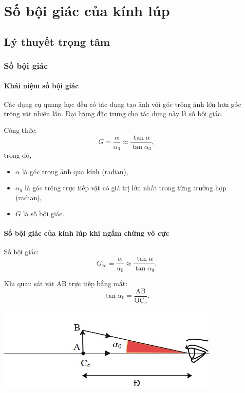 
\chapter{Số bội giác của kính lúp}

\section{Lý thuyết trọng tâm}

\subsection{Số bội giác}
\subsubsection{Khái niệm số bội giác}
Các dụng cụ quang học đều có tác dụng tạo ảnh với góc trông ảnh lớn hơn góc trông vật nhiều lần. Đại lượng đặc trưng cho tác dụng này là số bội giác.

Công thức:
\begin{equation}
G=\dfrac{\alpha}{\alpha_0}\approx \dfrac{\tan \alpha}{\tan \alpha_0},
\end{equation}
trong đó,
\begin{itemize}
	\item $\alpha$ là góc trong ảnh qua kính (radian),
	\item $\alpha_0$ là góc trông trực tiếp vật có giá trị lớn nhất trong từng trường hợp (radian),
	\item $G$ là số bội giác. 
	
\end{itemize}

\subsubsection{Số bội giác của kính lúp khi ngắm chừng vô cực}

Số bội giác: $$G_\infty=\dfrac{\alpha}{\alpha_0}\approx \dfrac{\tan \alpha}{\tan \alpha_0}.$$ 

Khi quan sát vật AB trực tiếp bằng mắt: $$\tan \alpha_0=\dfrac{\text{AB}}{\text{OC}_\text{c}}.$$
\begin{center}
	\includegraphics[scale=0.8]{../figs/VN11-PH-41-L-029-2-h47.jpg}
\end{center}


